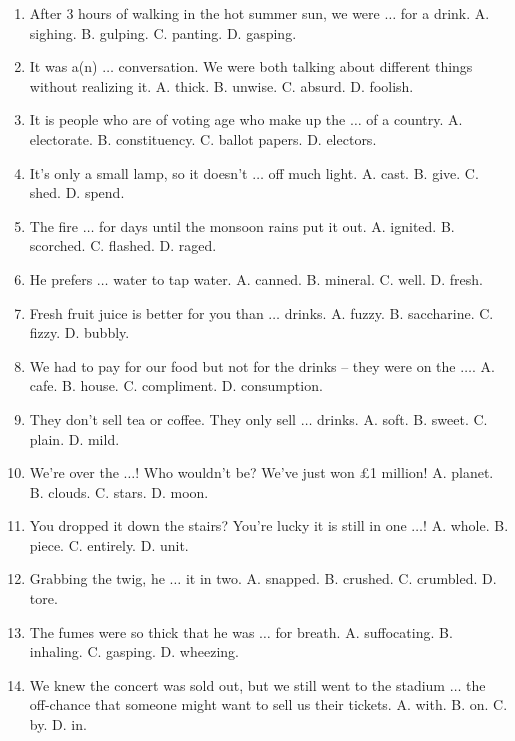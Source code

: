 \documentclass{article}
\numberwithin{equation}{section}
\begin{document}
\begin{enumerate}[leftmargin=8mm]
	\item After 3 hours of walking in the hot summer sun, we were $\ldots$ for a drink. {\sf A.} sighing. {\sf B.} gulping. {\sf C.} panting. {\sf D.} gasping.
	\item It was a(n) $\ldots$ conversation. We were both talking about different things without realizing it. {\sf A.} thick. {\sf B.} unwise. {\sf C.} absurd. {\sf D.} foolish.
	\item It is people who are of voting age who make up the $\ldots$ of a country. {\sf A.} electorate. {\sf B.} constituency. {\sf C.} ballot papers. {\sf D.} electors.
	\item It's only a small lamp, so it doesn't $\ldots$ off much light. {\sf A.} cast. {\sf B.} give. {\sf C.} shed. {\sf D.} spend.
	\item The fire $\ldots$ for days until the monsoon rains put it out. {\sf A.} ignited. {\sf B.} scorched. {\sf C.} flashed. {\sf D.} raged.
	\item He prefers $\ldots$ water to tap water. {\sf A.} canned. {\sf B.} mineral. {\sf C.} well. {\sf D.} fresh.
	\item Fresh fruit juice is better for you than $\ldots$ drinks. {\sf A.} fuzzy. {\sf B.} saccharine. {\sf C.} fizzy. {\sf D.} bubbly.
	\item We had to pay for our food but not for the drinks -- they were on the $\ldots$. {\sf A.} cafe. {\sf B.} house. {\sf C.} compliment. {\sf D.} consumption.
	\item They don't sell tea or coffee. They only sell $\ldots$ drinks. {\sf A.} soft. {\sf B.} sweet. {\sf C.} plain. {\sf D.} mild.
	\item We're over the $\ldots$! Who wouldn't be? We've just won \pounds1 million! {\sf A.} planet. {\sf B.} clouds. {\sf C.} stars. {\sf D.} moon.
	\item You dropped it down the stairs? You're lucky it is still in one $\ldots$! {\sf A.} whole. {\sf B.} piece. {\sf C.} entirely. {\sf D.} unit.
	\item Grabbing the twig, he $\ldots$ it in two. {\sf A.} snapped. {\sf B.} crushed. {\sf C.} crumbled. {\sf D.} tore.
	\item The fumes were so thick that he was $\ldots$ for breath. {\sf A.} suffocating. {\sf B.} inhaling. {\sf C.} gasping. {\sf D.} wheezing.
	\item We knew the concert was sold out, but we still went to the stadium $\ldots$ the off-chance that someone might want to sell us their tickets. {\sf A.} with. {\sf B.} on. {\sf C.} by. {\sf D.} in.

\end{enumerate}
\end{document}
